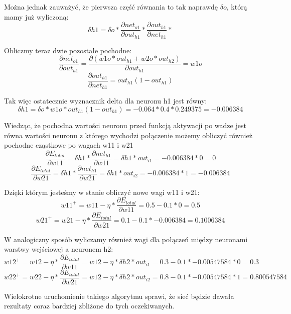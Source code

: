 Można jednak zauważyć, że pierwsza część równania to tak naprawdę \(\delta o\), którą mamy już wyliczoną:
\[
  \delta h1=
  \delta o *
  \frac{\partial net_{o1}}{\partial out_{h1}}*
  \frac{\partial out_{h1}}{\partial net_{h1}}*
\]

Obliczmy teraz dwie pozostałe pochodne:
\[
  \frac{\partial net_{o1}}{\partial out_{h1}} = \frac{\partial (w1o * out_{h1} + w2o * out_{h2})}{\partial out_{h1}}=w1o
\]
\[
  \frac{\partial out_{h1}}{\partial net_{h1}} = out_{h1}(1 - out_{h1})
\]

Tak więc ostatecznie wyznacznik delta dla neuronu h1 jest równy:
\[
  \delta h1= \delta o * w1o * out_{h1}(1 - out_{h1}) = -0.064 * 0.4 * 0.249375 = -0.006384
\]

Wiedząc, że pochodna wartości neuronu przed funkcją aktywacji po wadze jest równa wartości neuronu z którego wychodzi połączenie
możemy obliczyć również pochodne cząstkowe po wagach w11 i w21
\[
  \frac{\partial E_{total}}{\partial w11}=\delta h1 * \frac{\partial net_{h1}}{\partial w11}=\delta h1 * out_{i1}=-0.006384 * 0=0
\]
\[
  \frac{\partial E_{total}}{\partial w21}=\delta h1 * \frac{\partial net_{h1}}{\partial w21}=\delta h1 * out_{i2}=-0.006384 * 1=-0.006384
\]

Dzięki którym jesteśmy w stanie obliczyć nowe wagi w11 i w21:
\[
  w11^{+} = w11 - \eta * \frac{\partial E_{total}}{\partial w11}=0.5-0.1*0=0.5
\]
\[
  w21^{+} = w21 - \eta * \frac{\partial E_{total}}{\partial w21}=0.1-0.1*-0.006384=0.1006384
\]

W analogiczny sposób wyliczamy również wagi dla połączeń między neuronami warstwy wejściowej a neuronem h2:
\[
  w12^{+} = w12 - \eta * \frac{\partial E_{total}}{\partial w11}=w12 - \eta * \delta h2 * out_{i1}=0.3-0.1*-0.00547584*0=0.3
\]
\[
  w22^{+} = w22 - \eta * \frac{\partial E_{total}}{\partial w21}=w12 - \eta * \delta h2 * out_{i2}=0.8-0.1*-0.00547584*1=0.800547584
\]

Wielokrotne uruchomienie takiego algorytmu sprawi, że sieć będzie dawała rezultaty coraz bardziej zbliżone do tych oczekiwanych.





